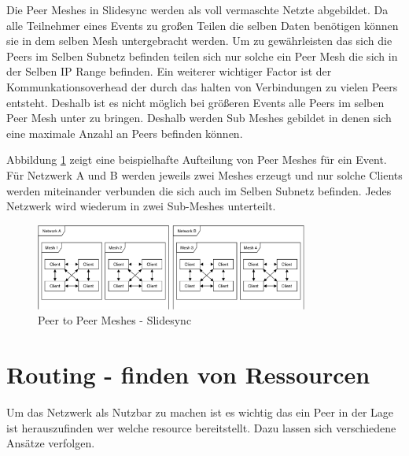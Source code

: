 Die Peer Meshes in Slidesync werden als voll vermaschte Netzte abgebildet. Da alle Teilnehmer eines Events zu großen Teilen die selben Daten benötigen können sie in dem selben Mesh untergebracht werden. Um zu gewährleisten das sich die Peers im Selben Subnetz befinden teilen sich nur solche ein Peer Mesh die sich in der Selben IP Range befinden. Ein weiterer wichtiger Factor ist der Kommunkationsoverhead der durch das halten von Verbindungen zu vielen Peers entsteht. Deshalb ist es nicht möglich bei größeren Events alle Peers im selben Peer Mesh unter zu bringen. Deshalb werden Sub Meshes gebildet in denen sich eine maximale Anzahl an Peers befinden können. 

Abbildung \ref{fig:mesh-slidesync} zeigt eine beispielhafte Aufteilung von Peer Meshes für ein Event. Für Netzwerk A und B werden jeweils zwei Meshes erzeugt und nur solche Clients werden miteinander verbunden die sich auch im Selben Subnetz befinden. Jedes Netzwerk wird wiederum in zwei Sub-Meshes unterteilt.

\begin{figure}[!h]
	\centering
	\includegraphics[width=0.8\textwidth]{figures/slidesync_peer_meshes}
	\caption[A Figure Short-Title]{Peer to Peer Meshes - Slidesync}
	\label{fig:mesh-slidesync}
\end{figure}


%



\section{Routing - finden von Ressourcen}

Um das \pTp Netzwerk als \cdn Nutzbar zu machen ist es wichtig das ein Peer in der Lage ist herauszufinden wer welche resource bereitstellt. Dazu lassen sich verschiedene Ansätze verfolgen.

